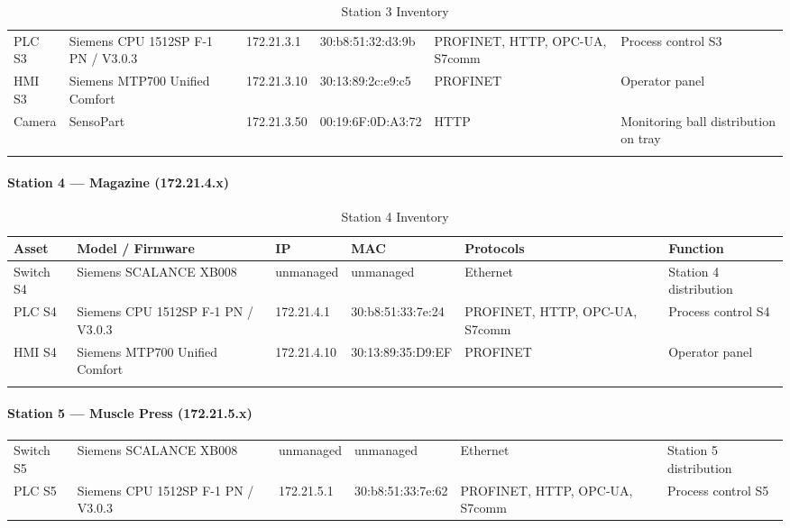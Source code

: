 \documentclass[11pt,a4paper]{article}
\begin{document}
{\begin{longtable}{L{2cm} L{2.1cm} L{2.1cm} L{2.6cm} L{2.4cm} L{4cm}}
    PLC S3 & Siemens CPU 1512SP F-1 PN / V3.0.3 & 172.21.3.1 & 30:b8:51:32:d3:9b &
    PROFINET, HTTP, OPC-UA, S7comm & Process control S3 \\

    HMI S3 & Siemens MTP700 Unified Comfort & 172.21.3.10 & 30:13:89:2c:e9:c5 &
    PROFINET & Operator panel \\

    Camera & SensoPart & 172.21.3.50 & 00:19:6F:0D:A3:72 & HTTP & Monitoring ball distribution on tray \\

\bottomrule
    \caption{Station 3 Inventory}
\end{longtable}

\pagebreak
\paragraph{Station 4 --- Magazine (172.21.4.x)}
\begin{longtable}{L{2cm} L{2.1cm} L{2.1cm} L{2.6cm} L{2.4cm} L{4cm}}
\toprule
\textbf{Asset} & \textbf{Model / Firmware} & \textbf{IP} & \textbf{MAC} & \textbf{Protocols} & \textbf{Function} \\
\midrule \endhead
    Switch S4 & Siemens SCALANCE XB008 & unmanaged & unmanaged & Ethernet &
    Station 4 distribution \\

    PLC S4 & Siemens CPU 1512SP F-1 PN / V3.0.3 & 172.21.4.1 & 30:b8:51:33:7e:24 &
    PROFINET, HTTP, OPC-UA, S7comm & Process control S4 \\

    HMI S4 & Siemens MTP700 Unified Comfort & 172.21.4.10 & 30:13:89:35:D9:EF &
    PROFINET & Operator panel \\

\bottomrule
    \caption{Station 4 Inventory}
\end{longtable}

\paragraph{Station 5 --- Muscle Press (172.21.5.x)}
\begin{longtable}{L{2cm} L{2.1cm} L{2.1cm} L{2.6cm} L{2.4cm} L{4cm}}
\toprule
\midrule \endhead
    Switch S5 & Siemens SCALANCE XB008 & unmanaged & unmanaged & Ethernet &
    Station 5 distribution \\

    PLC S5 & Siemens CPU 1512SP F-1 PN / V3.0.3 & 172.21.5.1 & 30:b8:51:33:7e:62 &
    PROFINET, HTTP, OPC-UA, S7comm & Process control S5 \\


\end{longtable}}
\end{document}
